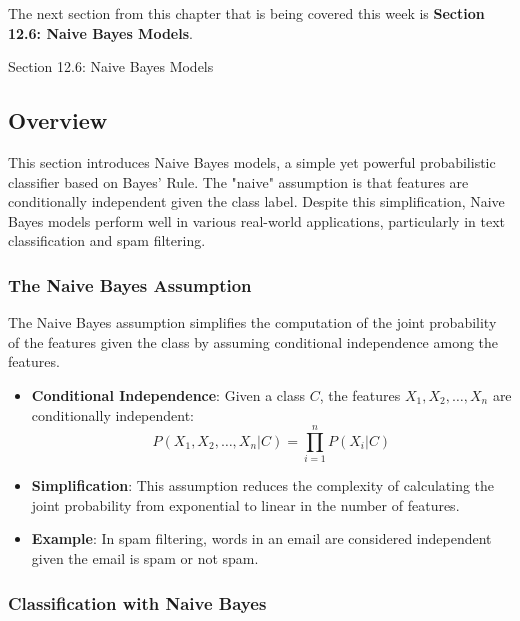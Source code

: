 The next section from this chapter that is being covered this week is \textbf{Section 12.6: Naive Bayes Models}.

\begin{notes}{Section 12.6: Naive Bayes Models}
    \subsection*{Overview}

    This section introduces Naive Bayes models, a simple yet powerful probabilistic classifier based on Bayes' Rule. The "naive" assumption is that features are conditionally independent given the class label. 
    Despite this simplification, Naive Bayes models perform well in various real-world applications, particularly in text classification and spam filtering.
    
    \subsubsection*{The Naive Bayes Assumption}
    
    The Naive Bayes assumption simplifies the computation of the joint probability of the features given the class by assuming conditional independence among the features.
    
    \begin{highlight}
    
        \begin{itemize}
            \item \textbf{Conditional Independence}: Given a class $C$, the features $X_1, X_2, \ldots, X_n$ are conditionally independent:
            \[
            P(X_1, X_2, \ldots, X_n | C) = \prod_{i=1}^n P(X_i | C)
            \]
            \item \textbf{Simplification}: This assumption reduces the complexity of calculating the joint probability from exponential to linear in the number of features.
            \item \textbf{Example}: In spam filtering, words in an email are considered independent given the email is spam or not spam.
        \end{itemize}
    
    \end{highlight}
    
    \subsubsection*{Classification with Naive Bayes}
    

\end{notes}
